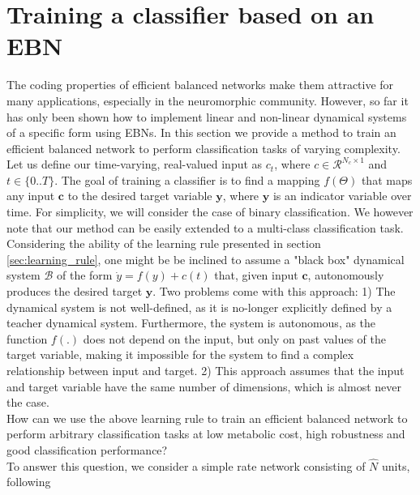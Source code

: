 \documentclass[twoside,11pt,titlepage]{article}
\begin{document}
\section{Training a classifier based on an EBN}
The coding properties of efficient balanced networks make them attractive for many applications, especially in the neuromorphic community. However, so far it has only been shown how to
implement linear and non-linear dynamical systems of a specific form using EBNs. In this section we provide a method to train an efficient balanced network to perform classification tasks of varying
complexity. \\
Let us define our time-varying, real-valued input as $c_t$, where $c \in \mathcal{R}^{N_c \times 1}$ and $t \in \{0..T\}$.
The goal of training a classifier is to find a mapping $f(\Theta)$ that maps any input $\mathbf{c}$ to the desired target variable $\mathbf{y}$,
where $\mathbf{y}$ is an indicator variable over time.
For simplicity, we will consider the case of binary classification. We however note that our method can be easily extended to a multi-class classification task. \\
Considering the ability of the learning rule presented in section \ref{sec:learning_rule}, one might be be inclined to assume a "black box" dynamical system $\mathcal{B}$
of the form $\dot{y} = f(y) + c(t)$ that, given input $\mathbf{c}$, autonomously produces the desired target $\mathbf{y}$. Two problems come with this approach:
1) The dynamical system is not well-defined, as it is no-longer explicitly defined by a teacher dynamical system. Furthermore, the system is autonomous, as the function
$f(.)$ does not depend on the input, but only on past values of the target variable, making it impossible for the system to find a complex relationship between input and target.
2) This approach assumes that the input and target variable have the same number of dimensions,
which is almost never the case. \\
How can we use the above learning rule to train an efficient balanced network to perform arbitrary classification tasks at low metabolic cost, high robustness and good classification performance? \\
To answer this question, we consider a simple rate network consisting of $\hat{N}$ units, following
\end{document}
